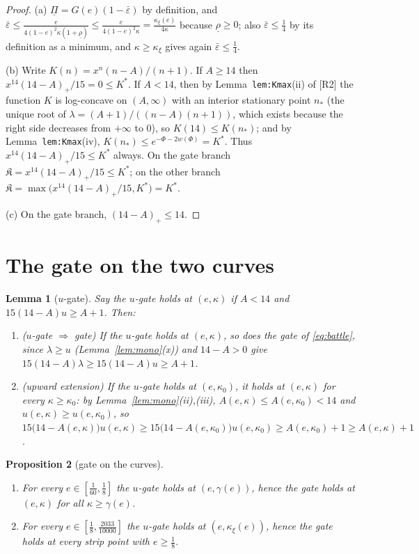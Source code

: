 \documentclass[11pt]{article}
\newtheorem{lemma}{Lemma}[section]
\newtheorem{proposition}[lemma]{Proposition}
\theoremstyle{remark}
\newcommand{\eps}{\varepsilon}
\newcommand{\Kfrak}{\mathfrak K}
\newcommand{\Kstar}{K^{*}}
\newcommand{\kxi}{\kappa_\xi}
\newcommand{\epsbar}{\bar\eps}
\newcommand{\RII}{[R2]}
\begin{document}
\begin{proof}
(a) $\underline\Pi=G(e)(1-\epsbar)$ by definition, and
$\epsbar\le\frac e{4(1-e)^2\kappa(1+\underline\rho)}
\le\frac e{4(1-e)^2\kappa}=\frac{\kxi(e)}{4\kappa}$ because
$\underline\rho\ge0$; also $\epsbar\le\tfrac14$ by its definition as a
minimum, and $\kappa\ge\kxi$ gives again $\epsbar\le\tfrac14$.

(b) Write $K(n)=x^n(n-A)/(n+1)$.  If $A\ge14$ then
$x^{14}(14-A)_+/15=0\le\Kstar$.  If $A<14$, then by
Lemma~\texttt{lem:Kmax}(ii) of \RII{} the function $K$ is log-concave on
$(A,\infty)$ with an interior stationary point $n_*$ (the unique root of
$\lambda=(A+1)/((n-A)(n+1))$, which exists because the right side decreases
from $+\infty$ to $0$), so $K(14)\le K(n_*)$; and by
Lemma~\texttt{lem:Kmax}(iv), $K(n_*)\le e^{-\Phi-2w(\Phi)}=\Kstar$.  Thus
$x^{14}(14-A)_+/15\le\Kstar$ always.  On the gate branch
$\Kfrak=x^{14}(14-A)_+/15\le\Kstar$; on the other branch
$\Kfrak=\max\bigl(x^{14}(14-A)_+/15,\Kstar\bigr)=\Kstar$.

(c) On the gate branch, $(14-A)_+\le14$.
\end{proof}

\section{The gate on the two curves}

\begin{lemma}[$u$-gate]\label{lem:ugate}
Say the \emph{$u$-gate} holds at $(e,\kappa)$ if $A<14$ and
$15(14-A)u\ge A+1$.  Then:
\begin{enumerate}[label=\textup{(\alph*)},itemsep=1pt]
\item ($u$-gate $\Rightarrow$ gate)  If the $u$-gate holds at $(e,\kappa)$,
so does the gate of \eqref{eq:battle}, since
$\lambda\ge u$ (Lemma~\ref{lem:mono}(x)) and $14-A>0$ give
$15(14-A)\lambda\ge15(14-A)u\ge A+1$.
\item (upward extension)  If the $u$-gate holds at $(e,\kappa_0)$, it holds
at $(e,\kappa)$ for every $\kappa\ge\kappa_0$: by
Lemma~\ref{lem:mono}(ii),(iii), $A(e,\kappa)\le A(e,\kappa_0)<14$ and
$u(e,\kappa)\ge u(e,\kappa_0)$, so
$15\bigl(14-A(e,\kappa)\bigr)u(e,\kappa)
\ge15\bigl(14-A(e,\kappa_0)\bigr)u(e,\kappa_0)\ge A(e,\kappa_0)+1\ge
A(e,\kappa)+1$. \qedhere
\end{enumerate}
\end{lemma}

\begin{proposition}[gate on the curves]\label{prop:gate}
\begin{enumerate}[label=\textup{(\alph*)},itemsep=1pt]
\item For every $e\in[\tfrac1{60},\tfrac18]$ the $u$-gate holds at
$(e,\gamma(e))$, hence the gate holds at $(e,\kappa)$ for all
$\kappa\ge\gamma(e)$.
\item For every $e\in[\tfrac18,\tfrac{2033}{10000}]$ the $u$-gate holds at
$(e,\kxi(e))$, hence the gate holds at every strip point with
$e\ge\tfrac18$.
\end{enumerate}
\end{proposition}
\end{document}
